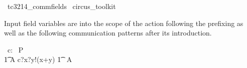 
\begin{zsection}
  \SECTION\ tc3214\_commfields \parents\ circus\_toolkit
\end{zsection}

Input field variables are into the scope of the action following
the prefixing as well as the following communication patterns
after its introduction.
%
\begin{circus}
     \circchannel\ c: \nat \cross \nat \cross \nat 
     \also
     \circprocess\ P \circdef\ \circbegin \\
       \t1 A \circdef c?x?y!(x+y) \then \Skip 
     	\t1 \circspot\ A \\	
     \circend
\end{circus}
